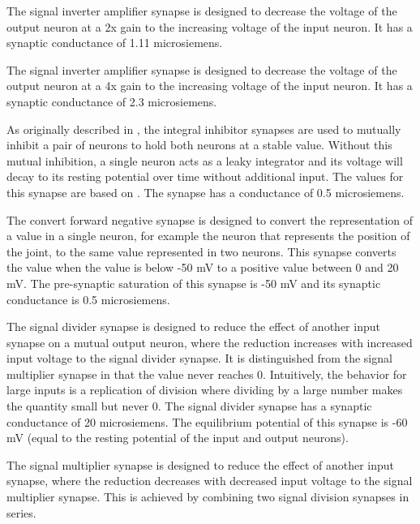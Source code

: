 
The signal inverter amplifier synapse is designed to decrease the voltage of
the output 
neuron at a 2x gain to the increasing voltage of the input neuron. It has a synaptic 
conductance of 1.11 microsiemens.


The signal inverter amplifier synapse is designed to decrease the voltage of
the output 
neuron at a 4x gain to the increasing voltage of the input neuron. It has a synaptic 
conductance of 2.3 microsiemens.


As originally described in \cite{NickFunctionalSubnetwork}, the integral inhibitor synapses are used to mutually inhibit a pair of neurons to hold both 
neurons at a stable value. Without this mutual inhibition, a single neuron acts
as a leaky integrator and its voltage will decay to its resting potential over time without additional input.  The values for this
synapse are based on \cite{NickFunctionalSubnetwork}. The synapse has a  
conductance of 0.5 microsiemens.


The convert forward negative synapse is designed to convert the representation
of a value in a single neuron, for example the neuron that represents the 
position of the joint, to the same value represented in two neurons. This
synapse converts the value when the value is below -50 mV to a positive value 
between 0 and 20 mV. The pre-synaptic
saturation of this synapse is -50 mV and its synaptic conductance is 0.5 microsiemens.


The signal divider synapse is designed to reduce the effect of another input
synapse on a mutual output neuron, where the reduction increases with increased input voltage to the
signal divider synapse. It is distinguished from the signal multiplier synapse
in that the value never reaches 0. Intuitively, the behavior for large inputs is a replication of 
division where dividing by a large number makes the quantity small but never 0.
The signal divider synapse has a synaptic conductance of 20 microsiemens. The equilibrium potential of
this synapse is -60 mV (equal to the resting potential of the input and output
neurons).


The signal multiplier synapse is designed to reduce the effect of another input
synapse, where the reduction decreases with decreased input voltage to the
signal multiplier synapse.  This is achieved by combining two signal division synapses in series.

